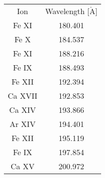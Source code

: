 \begin{tabular}{cc}
Ion & Wavelength [$\mathrm{\mathring{A}}$] \\
Fe XI & 180.401 \\
Fe X & 184.537 \\
Fe XI & 188.216 \\
Fe IX & 188.493 \\
Fe XII & 192.394 \\
Ca XVII & 192.853 \\
Ca XIV & 193.866 \\
Ar XIV & 194.401 \\
Fe XII & 195.119 \\
Fe IX & 197.854 \\
Ca XV & 200.972 \\
\end{tabular}
